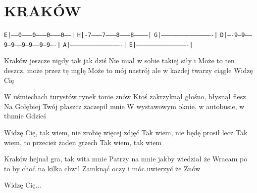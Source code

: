 \documentclass[../../../songbook.tex]{subfiles}
\begin{document}
\TabPositions{9cm} %
\section*{KRAKÓW}
{}
\vspace{0.5cm}
 \texttt{E|------0---------0---------0---------0------|}	\newline
 \texttt{H|-7---------7---------8---------8-----------|}	\newline
 \texttt{G|-------------------------------------------|}	\newline
 \texttt{D|----9---9-----9---9-----9---9-----9---9----|}	\newline
 \texttt{A|-------------------------------------------|}	\newline
 \texttt{E|-------------------------------------------|}	\newline

Kraków jeszcze nigdy tak jak dziś				 \newline
Nie miał w sobie takiej siły i					 \newline
Może to ten deszcz, może przez tę mgłę			 \newline
Może to mój nastrój ale w każdej twarzy ciągle	 \newline
Widzę Cię										 \newline

W uśmiechach turystów rynek tonie znów	 \newline
Ktoś zakrzyknął głośno, błysnął flesz \newline
Na Gołębiej Twój płaszcz zaczepił mnie \newline
W wystawowym oknie, w autobusie, w tłumie  \newline
Gdzieś \newline

\-\hspace{1cm} Widzę Cię, tak wiem, nie zrobię więcej zdjęć	 \newline
\-\hspace{1cm} Tak wiem, nie będę prosił lecz				 \newline
\-\hspace{1cm} Tak wiem, to przecież żaden grzech			 \newline
\-\hspace{1cm} Tak wiem, tak wiem							 \newline

Kraków hejnał gra, tak wita mnie \newline
Patrzy na mnie jakby wiedział że \newline
Wracam po to by choć na kilka chwil \newline
Zamknąć oczy i móc uwierzyć że \newline
Znów \newline

\-\hspace{1cm} Widzę Cię... \newline
\end{document}
